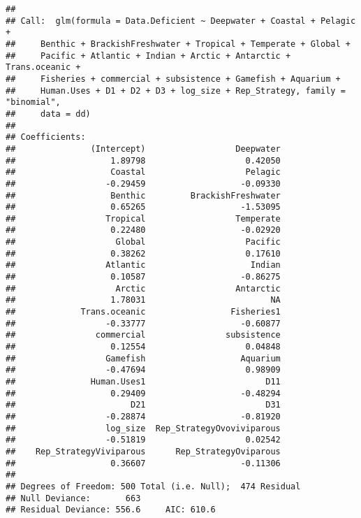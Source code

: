 \documentclass[]{article}
\begin{document}
\begin{verbatim}
## 
## Call:  glm(formula = Data.Deficient ~ Deepwater + Coastal + Pelagic + 
##     Benthic + BrackishFreshwater + Tropical + Temperate + Global + 
##     Pacific + Atlantic + Indian + Arctic + Antarctic + Trans.oceanic + 
##     Fisheries + commercial + subsistence + Gamefish + Aquarium + 
##     Human.Uses + D1 + D2 + D3 + log_size + Rep_Strategy, family = "binomial", 
##     data = dd)
## 
## Coefficients:
##               (Intercept)                  Deepwater  
##                   1.89798                    0.42050  
##                   Coastal                    Pelagic  
##                  -0.29459                   -0.09330  
##                   Benthic         BrackishFreshwater  
##                   0.65265                   -1.53095  
##                  Tropical                  Temperate  
##                   0.22480                   -0.02920  
##                    Global                    Pacific  
##                   0.38262                    0.17610  
##                  Atlantic                     Indian  
##                   0.10587                   -0.86275  
##                    Arctic                  Antarctic  
##                   1.78031                         NA  
##             Trans.oceanic                 Fisheries1  
##                  -0.33777                   -0.60877  
##                commercial                subsistence  
##                   0.12554                    0.04848  
##                  Gamefish                   Aquarium  
##                  -0.47694                    0.98909  
##               Human.Uses1                        D11  
##                   0.29409                   -0.48294  
##                       D21                        D31  
##                  -0.28874                   -0.81920  
##                  log_size  Rep_StrategyOvoviviparous  
##                  -0.51819                    0.02542  
##    Rep_StrategyViviparous      Rep_StrategyOviparous  
##                   0.36607                   -0.11306  
## 
## Degrees of Freedom: 500 Total (i.e. Null);  474 Residual
## Null Deviance:       663 
## Residual Deviance: 556.6     AIC: 610.6
\end{verbatim}
\end{document}
